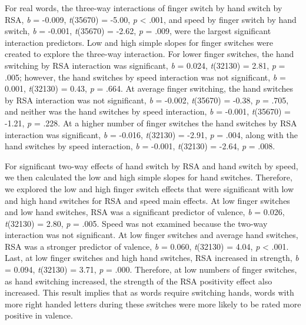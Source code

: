 \documentclass[english,man]{apa6}
\theoremstyle{definition}
\theoremstyle{definition}
\theoremstyle{definition}
\theoremstyle{remark}
\begin{document}
For real words, the three-way interactions of finger switch by hand
switch by RSA, \emph{b} = -0.009, \emph{t}(35670) = -5.00, \emph{p}
\textless{} .001, and speed by finger switch by hand switch, \emph{b} =
-0.001, \emph{t}(35670) = -2.62, \emph{p} = .009, were the largest
significant interaction predictors. Low and high simple slopes for
finger switches were created to explore the three-way interaction. For
lower finger switches, the hand switching by RSA interaction was
significant, \emph{b} = 0.024, \emph{t}(32130) = 2.81, \emph{p} = .005;
however, the hand switches by speed interaction was not significant,
\emph{b} = 0.001, \emph{t}(32130) = 0.43, \emph{p} = .664. At average
finger switching, the hand switches by RSA interaction was not
significant, \emph{b} = -0.002, \emph{t}(35670) = -0.38, \emph{p} =
.705, and neither was the hand switches by speed interaction, \emph{b} =
-0.001, \emph{t}(35670) = -1.21, \emph{p} = .228. At a higher number of
finger switches the hand switches by RSA interaction was significant,
\emph{b} = -0.016, \emph{t}(32130) = -2.91, \emph{p} = .004, along with
the hand switches by speed interaction, \emph{b} = -0.001,
\emph{t}(32130) = -2.64, \emph{p} = .008.

For significant two-way effects of hand switch by RSA and hand switch by
speed, we then calculated the low and high simple slopes for hand
switches. Therefore, we explored the low and high finger switch effects
that were significant with low and high hand switches for RSA and speed
main effects. At low finger switches and low hand switches, RSA was a
significant predictor of valence, \emph{b} = 0.026, \emph{t}(32130) =
2.80, \emph{p} = .005. Speed was not examined because the two-way
interaction was not significant. At low finger switches and average hand
switches, RSA was a stronger predictor of valence, \emph{b} = 0.060,
\emph{t}(32130) = 4.04, \emph{p} \textless{} .001. Last, at low finger
switches and high hand switches, RSA increased in strength, \emph{b} =
0.094, \emph{t}(32130) = 3.71, \emph{p} = .000. Therefore, at low
numbers of finger switches, as hand switching increased, the strength of
the RSA positivity effect also increased. This result implies that as
words require switching hands, words with more right handed letters
during these switches were more likely to be rated more positive in
valence.
\end{document}
